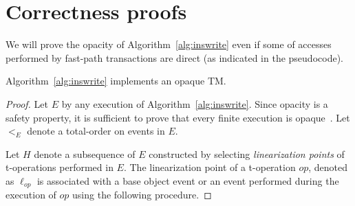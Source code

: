 \section{Correctness proofs}
\label{app:proofs}
%
We will prove the opacity of Algorithm~\ref{alg:inswrite} even if some of accesses performed by fast-path transactions are direct (as indicated in the pseudocode).
%
\begin{lemma}
\label{lm:opacityh1}
Algorithm~\ref{alg:inswrite} implements an opaque TM.
\end{lemma}
%
\begin{proof}
%
Let $E$ by any execution of Algorithm~\ref{alg:inswrite}. 
Since opacity is a safety property, it is sufficient to prove that every finite execution is opaque~\cite{icdcs-opacity}.
Let $<_E$ denote a total-order on events in $E$.

Let $H$ denote a subsequence of $E$ constructed by selecting
\emph{linearization points} of t-operations performed in $E$.
The linearization point of a t-operation $op$, denoted as $\ell_{op}$ is associated with  
a base object event or an event performed during 
the execution of $op$ using the following procedure. 


\end{proof}
